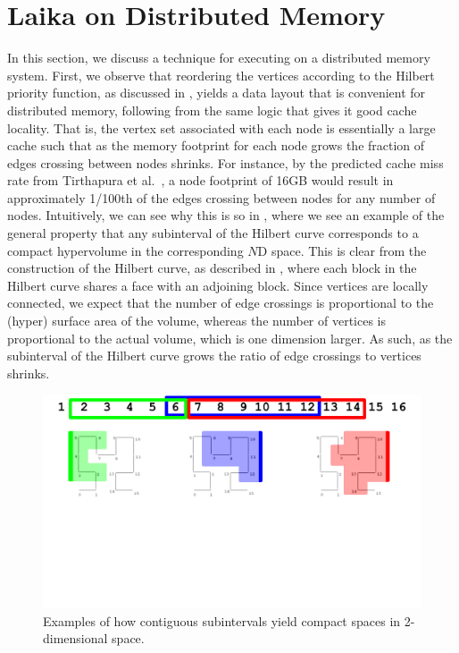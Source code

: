 \section{Laika on Distributed Memory}
\label{sec:partitions}

In this section, we discuss a technique for executing 
on a distributed memory system.  First, we observe that reordering the vertices
according to the Hilbert priority function, as discussed in , 
yields a data layout that
is convenient for distributed memory, following from the same logic that
gives it good cache locality.  That is, the vertex set associated with
each node is essentially a large cache such that as the memory footprint 
for each node grows the fraction of edges crossing between nodes shrinks.
For instance, by the predicted cache miss rate from Tirthapura et al.~\cite{TirthapuraSeAl06}, a node footprint of 16GB would result in approximately
1/100th of the edges crossing between nodes for any number of nodes.  Intuitively,
we can see why this is so in , where we see 
an example of the general property that any subinterval of the Hilbert curve
corresponds to a compact hypervolume in the corresponding $N$D space.  
This is clear from the construction of the Hilbert curve, as described in
, where each block in the Hilbert
curve shares a face with an adjoining block.  Since vertices are locally 
connected, we expect that the number of edge crossings is proportional to the
(hyper) surface area of the volume, whereas the number of vertices is 
proportional to the actual volume, which is one dimension larger.  As such,
as the subinterval of the Hilbert curve grows the ratio of edge
crossings to vertices shrinks.

\begin{figure}[h]
\centering
\includegraphics[width=5in,clip,trim=0 6cm 0 0]{figures/hilbert_compact.pdf}
\caption{Examples of how contiguous subintervals yield compact
spaces in 2-dimensional space.}
\label{fig:hilbert_compact}
\end{figure}

